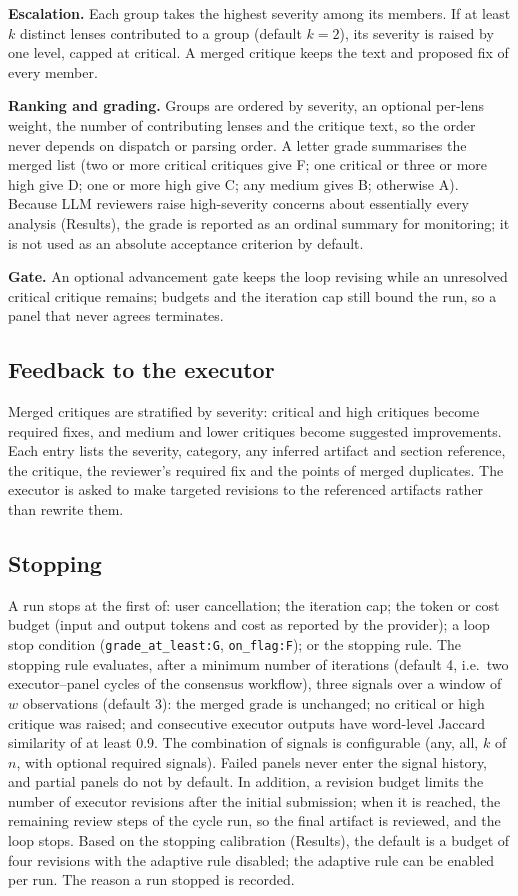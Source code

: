 \textbf{Escalation.} Each group takes the highest severity among its members. If at least $k$ distinct lenses contributed to a group (default $k=2$), its severity is raised by one level, capped at critical. A merged critique keeps the text and proposed fix of every member.

\textbf{Ranking and grading.} Groups are ordered by severity, an optional per-lens weight, the number of contributing lenses and the critique text, so the order never depends on dispatch or parsing order. A letter grade summarises the merged list (two or more critical critiques give F; one critical or three or more high give D; one or more high give C; any medium gives B; otherwise A). Because LLM reviewers raise high-severity concerns about essentially every analysis (Results), the grade is reported as an ordinal summary for monitoring; it is not used as an absolute acceptance criterion by default.

\textbf{Gate.} An optional advancement gate keeps the loop revising while an unresolved critical critique remains; budgets and the iteration cap still bound the run, so a panel that never agrees terminates.

\subsection*{Feedback to the executor}

Merged critiques are stratified by severity: critical and high critiques become required fixes, and medium and lower critiques become suggested improvements. Each entry lists the severity, category, any inferred artifact and section reference, the critique, the reviewer's required fix and the points of merged duplicates. The executor is asked to make targeted revisions to the referenced artifacts rather than rewrite them.

\subsection*{Stopping}

A run stops at the first of: user cancellation; the iteration cap; the token or cost budget (input and output tokens and cost as reported by the provider); a loop stop condition (\texttt{grade\_at\_least:G}, \texttt{on\_flag:F}); or the stopping rule. The stopping rule evaluates, after a minimum number of iterations (default 4, i.e.\ two executor--panel cycles of the consensus workflow), three signals over a window of $w$ observations (default 3): the merged grade is unchanged; no critical or high critique was raised; and consecutive executor outputs have word-level Jaccard similarity of at least 0.9. The combination of signals is configurable (any, all, $k$ of $n$, with optional required signals). Failed panels never enter the signal history, and partial panels do not by default. In addition, a revision budget limits the number of executor revisions after the initial submission; when it is reached, the remaining review steps of the cycle run, so the final artifact is reviewed, and the loop stops. Based on the stopping calibration (Results), the default is a budget of four revisions with the adaptive rule disabled; the adaptive rule can be enabled per run. The reason a run stopped is recorded.

